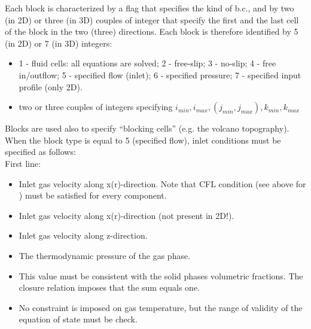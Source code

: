 Each block is characterized
by a flag that specifies the kind of b.c., and by two (in 2D) or three (in 3D)
couples of integer that specify the first and the last cell of the block in 
the two (three) directions. Each block is therefore identified by 5 (in 2D)
or 7 (in 3D) integers:\\

\begin{itemize}
\item
{}
{1 - fluid cells: all equations are solved; 2 - free-slip;
 3 - no-slip; 4 - free in/outflow; 5 - specified flow (inlet); 
 6 - specified pressure; 7 - specified input profile (only 2D).}

\item
{}
{two or three couples of integers specifying 
$ i_{min}, i_{max}, (j_{min}, j_{max}), k_{min}, k_{max}$ }

\end{itemize}

Blocks are used also to specify ``blocking cells'' (e.g. 
the volcano topography). When the block type is equal to 5 (specified
flow), inlet conditions must be specified as follows:\\

First line:

\begin{itemize}
\item
{}
{Inlet gas velocity along x(r)-direction. Note that CFL condition (see above for ) 
must be satisfied for every component.}

\item
{}
{Inlet gas velocity along x(r)-direction (not present in 2D!).}

\item
{}
{Inlet gas velocity along z-direction.}

\item
{}
{The thermodynamic pressure of the gas phase.}

\item
{}
{This value must be consistent with the solid phases volumetric fractions.
The closure relation imposes that the sum equals one.}

\item
{}
{No constraint is imposed on gas temperature, but the range of validity
of the equation of state must be check.}
\end{itemize}

